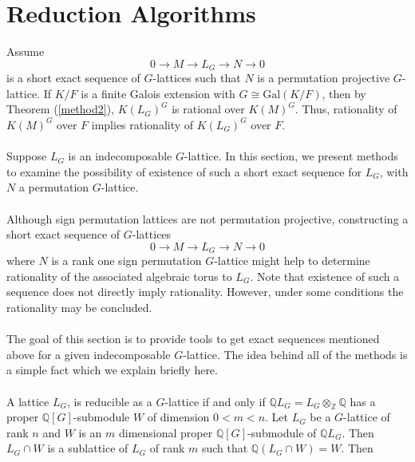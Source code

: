\documentclass{article}
\theoremstyle{plain}
\theoremstyle{definition}
\newcommand{\Z}{\ensuremath{\mathbb{Z}}}
\newcommand{\Q}{\ensuremath{\mathbb{Q}}}
\begin{document}
\section{Reduction Algorithms}
Assume $$0 \rightarrow M  \rightarrow L_G \rightarrow N \rightarrow 0$$ is a short 
exact sequence of $G$-lattices such that $N$ is a permutation projective $G$-lattice. 
If $K/F$ is a finite Galois extension with $G \cong \mathrm{Gal}(K/F)$, then by 
Theorem (\ref{method2}), $K(L_G)^G$ is rational over $K(M)^G$. Thus, rationality 
of $K(M)^G$ over $F$ implies rationality of $K(L_G)^G$ over $F$.\\
\\
Suppose $L_G$ is an indecomposable $G$-lattice. In this section, we present methods 
to examine the possibility of existence of such a short exact sequence for $L_G$, with
 $N$ a permutation $G$-lattice.\\
\\
Although sign permutation lattices are not permutation projective, constructing a 
short exact sequence of $G$-lattices $$0 \rightarrow M  \rightarrow L_G \rightarrow N \rightarrow 0$$ 
where $N$ is a rank one sign permutation $G$-lattice might help to determine 
rationality of the associated algebraic torus to $L_G$. Note that existence of 
such a sequence does not directly imply rationality. However, under some conditions 
the rationality may be concluded. \\
\\
The goal of this section is to provide tools to get exact sequences mentioned above 
for a given indecomposable $G$-lattice. The idea behind all of the methods is a simple 
fact which we explain briefly here.  \\
\\
A lattice $L_G$, is reducible as a $G$-lattice if and only if $\Q L_G = L_G \otimes_{\Z} \Q$ 
has a proper $\Q[G]$-submodule $W$ of dimension $0 < m < n$. Let $L_G$ be a $G$-lattice of 
rank $n$ and $W$ is an $m$ dimensional proper $\Q[G]$-submodule of $\Q L_G$. Then $L_G \cap W$ 
is a sublattice of $L_G$ of rank $m$ such that $\Q (L_G \cap W) = W$. Then
\end{document}
